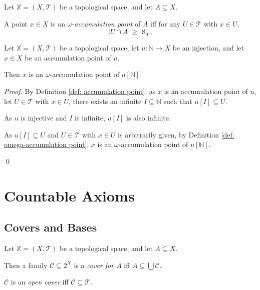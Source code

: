 \begin{definition}
	\label{def: omega-accumulation point}
	Let $\mathbb X = (X, \mathcal T)$ be a topological space, and let $A \subseteq X$.
	
	A point $x \in X$ is an \textit{$\omega$-accumulation point} of $A$ iff for any $U \in \mathcal T$ with $x \in U$,
	$$
	|U \cap A| \ge \aleph_0.
	$$
\end{definition}


\begin{proposition}
	Let $\mathbb X = (X, \mathcal T)$ be a topological space, let $u: \mathbb N \to X$ be an injection, and let $x \in X$ be an accumulation point of $u$.
	
	Then $x$ is an $\omega$-accumulation point of $u[\mathbb N]$.
	
	\begin{proof}
		By Definition \ref{def: accumulation point}, as $x$ is an accumulation point of $u$, let $U \in \mathcal T$ with $x \in U$, there exists an infinite $I \subseteq \mathbb N$ such that $u[I] \subseteq U$.
		
		As $u$ is injective and $I$ is infinite, $u[I]$ is also infinite.
		
		As $u[I] \subseteq U$ and $U \in \mathcal T$ with $x \in U$ is arbitrarily given, by Definition \ref{def: omega-accumulation point}, $x$ is an $\omega$-accumulation point of $u[\mathbb N]$.
		
		\qed
	\end{proof}
\end{proposition}


\chapter{Countable Axioms}


\section{Covers and Bases}


\begin{definition}
	\label{def: cover}
	Let $\mathbb X = (X, \mathcal T)$ be a topological space, and let $A \subseteq X$.
	
	Then a family $\mathcal C \subseteq 2^X$ is a \textit{cover for $A$} iff $A \subseteq \bigcup \mathcal C$.
	
	$\mathcal C$ is an \textit{open cover} iff $\mathcal C \subseteq \mathcal T$.
\end{definition}



